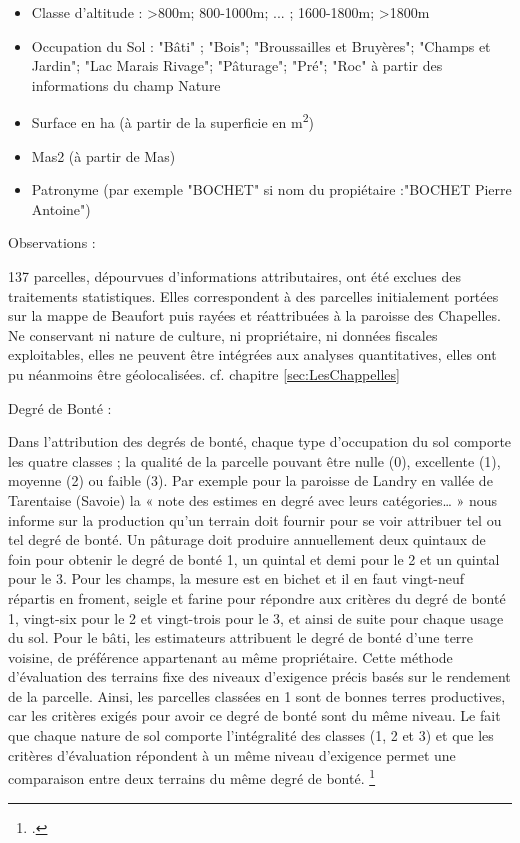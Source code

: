 \documentclass[12pt,a4paper]{report}
\begin{document}
\begin{itemize}
	
\vspace{1em}
Nous y l'avons complété avec quelques informations supplémentaires :
	\item Classe d'altitude : >800m; 800-1000m; ... ; 1600-1800m; >1800m
	\item Occupation du Sol : "Bâti" ; "Bois"; "Broussailles et Bruyères"; "Champs et Jardin"; "Lac Marais Rivage"; "Pâturage"; "Pré"; "Roc" à partir des informations du champ Nature
	\item Surface en ha (à partir de la superficie en m\textsuperscript{2})
	\item Mas2 (à partir de Mas)
	\item Patronyme   (par exemple "BOCHET" si nom du propiétaire :"BOCHET Pierre Antoine")
\end{itemize}

\medskip
Observations : 

137 parcelles, dépourvues d'informations attributaires, ont été exclues des traitements statistiques. Elles correspondent à des parcelles initialement portées sur la mappe de Beaufort puis rayées et réattribuées à la paroisse des Chapelles. Ne conservant ni nature de culture, ni propriétaire, ni données fiscales exploitables, elles ne peuvent être intégrées aux analyses quantitatives, elles ont pu néanmoins être géolocalisées. cf. chapitre \ref{sec:LesChappelles}

\medskip
Degré de Bonté :

Dans l’attribution des degrés de bonté, chaque type d’occupation du sol comporte les quatre classes ; la qualité de la parcelle pouvant être nulle (0), excellente (1), moyenne (2) ou faible (3). Par exemple pour la paroisse de Landry en vallée de Tarentaise (Savoie) la « note des estimes en degré avec leurs catégories… » nous informe sur la production qu’un terrain doit fournir pour se voir attribuer tel ou tel degré de bonté. Un pâturage doit produire annuellement deux quintaux de foin pour obtenir le degré de bonté 1, un quintal et demi pour le 2 et un quintal pour le 3. Pour les champs, la mesure est en bichet et il en faut vingt-neuf répartis en froment, seigle et farine pour répondre aux critères du degré de bonté 1, vingt-six pour le 2 et vingt-trois pour le 3, et ainsi de suite pour chaque usage du sol. Pour le bâti, les estimateurs attribuent le degré de bonté d’une terre voisine, de préférence appartenant au même propriétaire. Cette méthode d’évaluation des terrains fixe des niveaux d’exigence précis basés sur le rendement de la parcelle. Ainsi, les parcelles classées en 1 sont de bonnes terres productives, car les critères exigés pour avoir ce degré de bonté sont du même niveau. Le fait que chaque nature de sol comporte l’intégralité des classes (1, 2 et 3) et que les critères d’évaluation répondent à un même niveau d’exigence permet une comparaison entre deux terrains du même degré de bonté. \footcite[81--93]{Baud2010} 
\end{document}

